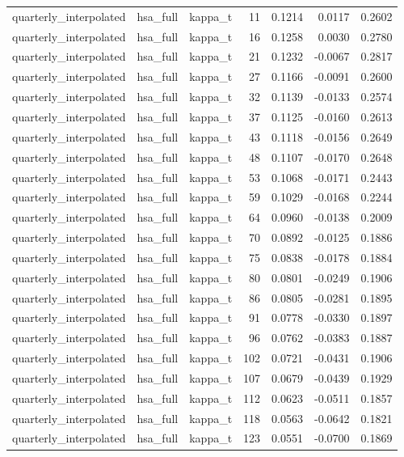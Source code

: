\begin{tabular}{lllrrrr}
quarterly\_interpolated & hsa\_full & kappa\_t & 11 & 0.1214 & 0.0117 & 0.2602 \\
quarterly\_interpolated & hsa\_full & kappa\_t & 16 & 0.1258 & 0.0030 & 0.2780 \\
quarterly\_interpolated & hsa\_full & kappa\_t & 21 & 0.1232 & -0.0067 & 0.2817 \\
quarterly\_interpolated & hsa\_full & kappa\_t & 27 & 0.1166 & -0.0091 & 0.2600 \\
quarterly\_interpolated & hsa\_full & kappa\_t & 32 & 0.1139 & -0.0133 & 0.2574 \\
quarterly\_interpolated & hsa\_full & kappa\_t & 37 & 0.1125 & -0.0160 & 0.2613 \\
quarterly\_interpolated & hsa\_full & kappa\_t & 43 & 0.1118 & -0.0156 & 0.2649 \\
quarterly\_interpolated & hsa\_full & kappa\_t & 48 & 0.1107 & -0.0170 & 0.2648 \\
quarterly\_interpolated & hsa\_full & kappa\_t & 53 & 0.1068 & -0.0171 & 0.2443 \\
quarterly\_interpolated & hsa\_full & kappa\_t & 59 & 0.1029 & -0.0168 & 0.2244 \\
quarterly\_interpolated & hsa\_full & kappa\_t & 64 & 0.0960 & -0.0138 & 0.2009 \\
quarterly\_interpolated & hsa\_full & kappa\_t & 70 & 0.0892 & -0.0125 & 0.1886 \\
quarterly\_interpolated & hsa\_full & kappa\_t & 75 & 0.0838 & -0.0178 & 0.1884 \\
quarterly\_interpolated & hsa\_full & kappa\_t & 80 & 0.0801 & -0.0249 & 0.1906 \\
quarterly\_interpolated & hsa\_full & kappa\_t & 86 & 0.0805 & -0.0281 & 0.1895 \\
quarterly\_interpolated & hsa\_full & kappa\_t & 91 & 0.0778 & -0.0330 & 0.1897 \\
quarterly\_interpolated & hsa\_full & kappa\_t & 96 & 0.0762 & -0.0383 & 0.1887 \\
quarterly\_interpolated & hsa\_full & kappa\_t & 102 & 0.0721 & -0.0431 & 0.1906 \\
quarterly\_interpolated & hsa\_full & kappa\_t & 107 & 0.0679 & -0.0439 & 0.1929 \\
quarterly\_interpolated & hsa\_full & kappa\_t & 112 & 0.0623 & -0.0511 & 0.1857 \\
quarterly\_interpolated & hsa\_full & kappa\_t & 118 & 0.0563 & -0.0642 & 0.1821 \\
quarterly\_interpolated & hsa\_full & kappa\_t & 123 & 0.0551 & -0.0700 & 0.1869 \\

\end{tabular}
